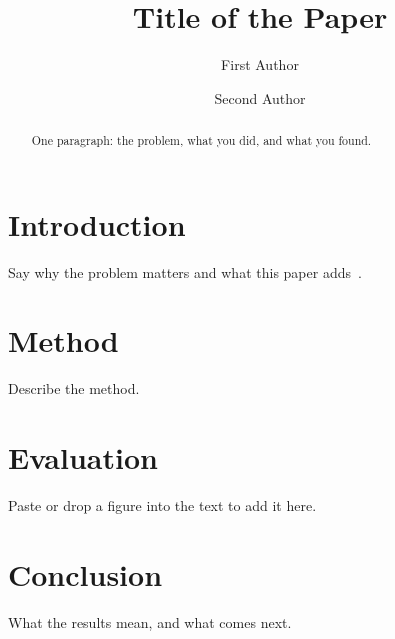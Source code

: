 \documentclass[sigconf]{acmart}
\begin{document}
\title{Title of the Paper}

\author{First Author}

\author{Second Author}

\begin{abstract}
One paragraph: the problem, what you did, and what you found.
\end{abstract}


\maketitle

\section{Introduction}
Say why the problem matters and what this paper adds~\cite{knuth1984}.

\section{Method}
Describe the method.

\section{Evaluation}
Paste or drop a figure into the text to add it here.

\section{Conclusion}
What the results mean, and what comes next.



\end{document}
